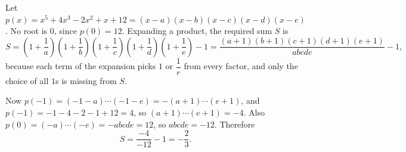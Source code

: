 Let $p(x)=x^5+4x^3-2x^2+x+12=(x-a)(x-b)(x-c)(x-d)(x-e)$. No root is $0$, since $p(0)=12$. Expanding a product, the required sum $S$ is
\[S=\left(1+\dfrac1a\right)\left(1+\dfrac1b\right)\left(1+\dfrac1c\right)\left(1+\dfrac1d\right)\left(1+\dfrac1e\right)-1=\dfrac{(a+1)(b+1)(c+1)(d+1)(e+1)}{abcde}-1,\]
because each term of the expansion picks $1$ or $\dfrac1r$ from every factor, and only the choice of all $1$s is missing from $S$.

Now $p(-1)=(-1-a)\cdots(-1-e)=-(a+1)\cdots(e+1)$, and $p(-1)=-1-4-2-1+12=4$, so $(a+1)\cdots(e+1)=-4$. Also $p(0)=(-a)\cdots(-e)=-abcde=12$, so $abcde=-12$. Therefore
\[S=\dfrac{-4}{-12}-1=\boxed{-\dfrac23}.\]
